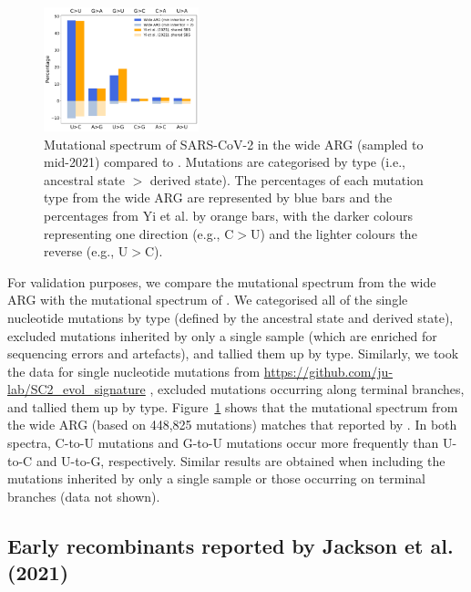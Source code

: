 \documentclass{article}
\begin{document}
\begin{figure} \centering
\includegraphics[width=0.4\textwidth]{figures/mutational_spectra.pdf}
\caption{\label{fig:mutational_spectra}
Mutational spectrum of SARS-CoV-2 in
the wide ARG (sampled to mid-2021) compared to \cite{Yi2021-sc}. Mutations are
categorised by type (i.e., ancestral state $>$ derived state). The percentages
of each mutation type from the wide ARG are represented by blue bars and the
percentages from Yi et al. by orange bars, with the darker colours representing
one direction (e.g., C$>$U) and the lighter colours the reverse (e.g., U$>$C).}
\end{figure}

For validation purposes, we compare the mutational spectrum from the wide ARG with the mutational spectrum of \citet{Yi2021-sc}. We categorised all of the single nucleotide mutations by type (defined by the ancestral state and derived state), excluded mutations inherited by only a single sample (which are enriched for sequencing errors and artefacts), and tallied them up by type. Similarly, we took the data for single nucleotide mutations from \url{https://github.com/ju-lab/SC2_evol_signature} \citep{Yi2021-sc}, excluded mutations occurring along terminal branches, and tallied them up by type. Figure~\ref{fig:mutational_spectra} shows that the mutational spectrum from the wide ARG (based on 448,825 mutations) matches that reported by \citet[based on 92,344 mutations]{Yi2021-sc}. In both spectra, C-to-U mutations and G-to-U mutations occur more frequently than U-to-C and U-to-G, respectively. Similar results are obtained when including the mutations inherited by only a single sample or those occurring on terminal branches (data not shown).


\subsection{Early recombinants reported by Jackson et al. (2021)}
\end{document}
